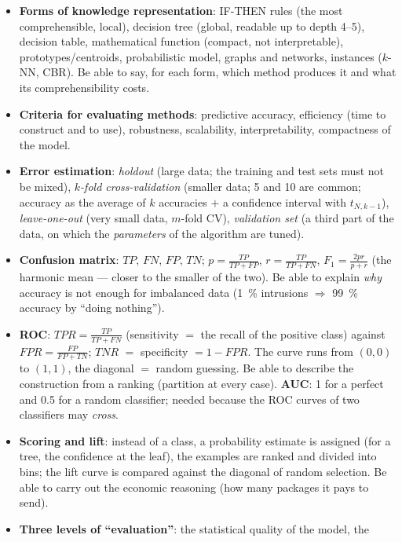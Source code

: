 \documentclass[11pt,a4paper]{article}
\theoremstyle{definition}
\providecommand{\uv}[1]{``#1''}
\begin{document}
\begin{itemize}
\item \textbf{Forms of knowledge representation}: IF-THEN rules (the most comprehensible, local),
      decision tree (global, readable up to depth 4--5), decision table, mathematical function
      (compact, not interpretable), prototypes/centroids, probabilistic model, graphs and networks,
      instances ($k$-NN, CBR). Be able to say, for each form, which method produces it and what its
      comprehensibility costs.
\item \textbf{Criteria for evaluating methods}: predictive accuracy, efficiency (time to construct
      and to use), robustness, scalability, interpretability, compactness of the model.
\item \textbf{Error estimation}: \emph{holdout} (large data; the training and test sets must not be
      mixed), \emph{$k$-fold cross-validation} (smaller data; 5 and 10 are common; accuracy as the
      average of $k$ accuracies $+$ a confidence interval with $t_{N,k-1}$),
      \emph{leave-one-out} (very small data, $m$-fold CV), \emph{validation set} (a third part of
      the data, on which the \emph{parameters} of the algorithm are tuned).
\item \textbf{Confusion matrix}: $TP$, $FN$, $FP$, $TN$; $p=\frac{TP}{TP+FP}$,
      $r=\frac{TP}{TP+FN}$, $F_1=\frac{2pr}{p+r}$ (the harmonic mean --- closer to the smaller of
      the two). Be able to explain \emph{why} accuracy is not enough for imbalanced data (1~\%
      intrusions $\Rightarrow$ 99~\% accuracy by \uv{doing nothing}).
\item \textbf{ROC}: $\mathit{TPR}=\frac{TP}{TP+FN}$ (sensitivity $=$ the recall of the positive
      class) against $\mathit{FPR}=\frac{FP}{FP+TN}$; $\mathit{TNR}$ $=$ specificity
      $=1-\mathit{FPR}$. The curve runs from $(0,0)$ to $(1,1)$, the diagonal $=$ random guessing.
      Be able to describe the construction from a ranking (partition at every case). \textbf{AUC}:
      1 for a perfect and 0.5 for a random classifier; needed because the ROC curves of two
      classifiers may \emph{cross}.
\item \textbf{Scoring and lift}: instead of a class, a probability estimate is assigned (for a tree,
      the confidence at the leaf), the examples are ranked and divided into bins; the lift curve is
      compared against the diagonal of random selection. Be able to carry out the economic
      reasoning (how many packages it pays to send).
\item \textbf{Three levels of \uv{evaluation}}: the statistical quality of the model, the

\end{itemize}
\end{document}
